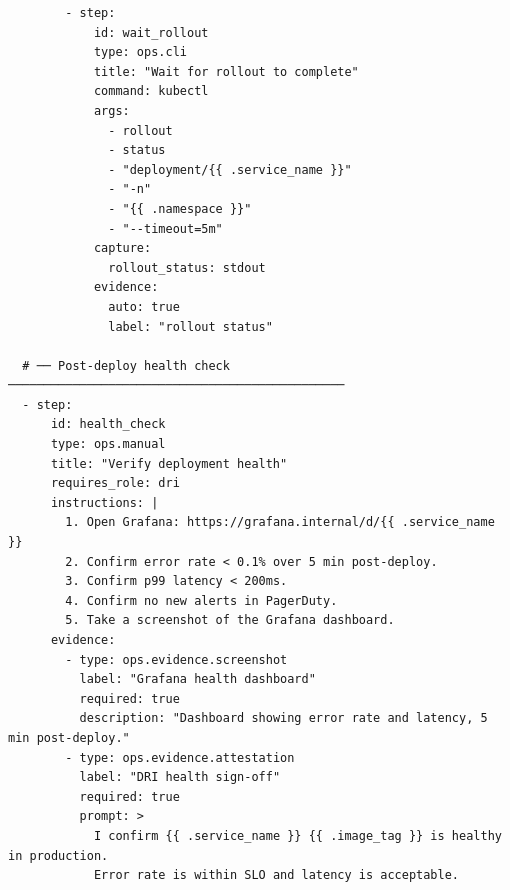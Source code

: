 \begin{verbatim}
        - step:
            id: wait_rollout
            type: ops.cli
            title: "Wait for rollout to complete"
            command: kubectl
            args:
              - rollout
              - status
              - "deployment/{{ .service_name }}"
              - "-n"
              - "{{ .namespace }}"
              - "--timeout=5m"
            capture:
              rollout_status: stdout
            evidence:
              auto: true
              label: "rollout status"

  # ── Post-deploy health check ───────────────────────────────────────────────
  - step:
      id: health_check
      type: ops.manual
      title: "Verify deployment health"
      requires_role: dri
      instructions: |
        1. Open Grafana: https://grafana.internal/d/{{ .service_name }}
        2. Confirm error rate < 0.1% over 5 min post-deploy.
        3. Confirm p99 latency < 200ms.
        4. Confirm no new alerts in PagerDuty.
        5. Take a screenshot of the Grafana dashboard.
      evidence:
        - type: ops.evidence.screenshot
          label: "Grafana health dashboard"
          required: true
          description: "Dashboard showing error rate and latency, 5 min post-deploy."
        - type: ops.evidence.attestation
          label: "DRI health sign-off"
          required: true
          prompt: >
            I confirm {{ .service_name }} {{ .image_tag }} is healthy in production.
            Error rate is within SLO and latency is acceptable.
\end{verbatim}

